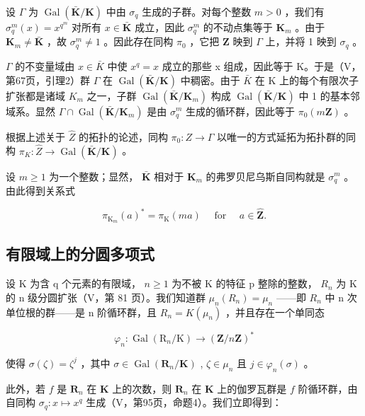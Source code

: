 设 \(\Gamma\) 为 \(\operatorname{Gal}(\bar{\mathbf{K}} / \mathbf{K})\) 中由 \(\sigma_q\) 生成的子群。对每个整数 \(m > 0\) ，我们有 \(\sigma_q^m (x) = x^{q^m}\) 对所有 \(x\in \bar{\mathbf{K}}\) 成立，因此 \(\sigma_q^m\) 的不动点集等于 \(\mathbf{K}_m\) 。由于 \(\mathbf{K}_m\neq \bar{\mathbf{K}}\) ，故 \(\sigma_q^m\neq 1\) 。因此存在同构 \(\pi_0\) ，它把 \(\mathbf{Z}\) 映到 \(\Gamma\) 上，并将 1 映到 \(\sigma_q\) 。

\(\Gamma\) 的不变量域由 \(x \in \bar{K}\) 中使 \(x^{q} = x\) 成立的那些 x 组成，因此等于 K。于是（V，第67页，引理2）群 \(\Gamma\) 在 \(\operatorname{Gal}(\bar{\mathbf{K}}/\mathbf{K})\) 中稠密。由于 \(\bar{K}\) 在 K 上的每个有限次子扩张都是诸域 \(K_{m}\) 之一，子群 \(\operatorname{Gal}(\bar{\mathbf{K}}/\mathbf{K}_{m})\) 构成 \(\operatorname{Gal}(\bar{\mathbf{K}}/\mathbf{K})\) 中 1 的基本邻域系。显然 \(\Gamma \cap \operatorname{Gal}(\bar{\mathbf{K}}/\mathbf{K}_{m})\) 是由 \(\sigma_{q}^{m}\) 生成的循环群，因此等于 \(\pi_{0}(m\mathbf{Z})\) 。

根据上述关于 \(\hat{Z}\) 的拓扑的论述，同构 \(\pi_{0}:Z\to\Gamma\) 以唯一的方式延拓为拓扑群的同构 \(\pi_{K}:\hat{Z}\to\operatorname{Gal}(\bar{\mathbf{K}}/\mathbf{K})\) 。

设 \(m \geqslant 1\) 为一个整数；显然， \(\bar{\mathbf{K}}\) 相对于 \(\mathbf{K}_m\) 的弗罗贝尼乌斯自同构就是 \(\sigma_q^m\) 。由此得到关系式

\[
\pi_ {\mathrm{K} _ {m}} (a) ^ {*} = \pi_ {\mathrm{K}} (m a) \quad \text { for } \quad a \in \hat {\mathbf {Z}}.\tag{5}
\]

\subsection{有限域上的分圆多项式}

设 K 为含 q 个元素的有限域， \(n \geqslant 1\) 为不被 K 的特征 p 整除的整数， \(R_{n}\) 为 K 的 n 级分圆扩张（V，第 81 页）。我们知道群 \(\mu_{n}(R_{n}) = \mu_{n}\) ——即 \(R_{n}\) 中 n 次单位根的群——是 n 阶循环群，且 \(R_{n} = K(\mu_{n})\) ，并且存在一个单同态

\[
\varphi_ {n}: \operatorname{Gal} \left(\mathrm{R} _ {n} / \mathrm{K}\right)\rightarrow (\mathbf {Z} / n \mathbf {Z}) ^ {*}
\]

使得 \(\sigma(\zeta) = \zeta^j\) ，其中 \(\sigma \in \operatorname{Gal}(\mathbf{R}_n / \mathbf{K})\) , \(\zeta \in \mu_n\) 且 \(j \in \varphi_n(\sigma)\) 。

此外，若 \(f\) 是 \(\mathbf{R}_n\) 在 \(\mathbf{K}\) 上的次数，则 \(\mathbf{R}_n\) 在 \(\mathbf{K}\) 上的伽罗瓦群是 \(f\) 阶循环群，由自同构 \(\sigma_q: x \mapsto x^q\) 生成（V，第95页，命题4）。我们立即得到：

